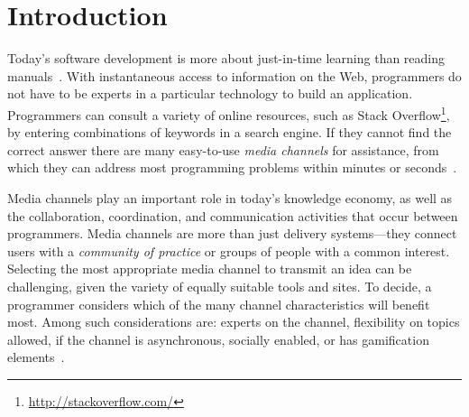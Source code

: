 \documentclass{sig-alternate-05-2015}
\begin{document}


\section{Introduction}
\label{cha:introduction}

	Today's software development is more about just-in-time learning than reading manuals~\cite{Hartmann2008}.
	With instantaneous access to information on the Web, programmers do not have to be experts in a particular technology to build an application.
	Programmers can consult a variety of online resources, such as Stack Overflow\footnote{\url{http://stackoverflow.com/}}, by entering combinations of keywords in a search engine.
	If they cannot find the correct answer there are many easy-to-use \textit{media channels} for assistance, from which they can address most programming problems within minutes or seconds~\cite{Mamykina2011}.

Media channels play an important role in today's knowledge economy, as well as the collaboration, coordination, and communication activities that occur between programmers.
Media channels are more than just delivery systems---they connect users with a \textit{community of practice} or groups of people with a common interest.
Selecting the most appropriate media channel to transmit an idea can be challenging, given the variety of equally suitable tools and sites.
To decide, a programmer considers which of the many channel characteristics will benefit most.
Among such considerations are: experts on the channel, flexibility on topics allowed, if the channel is asynchronous, socially enabled, or has gamification elements~\cite{Vasilescu2014c}.

\end{document}
